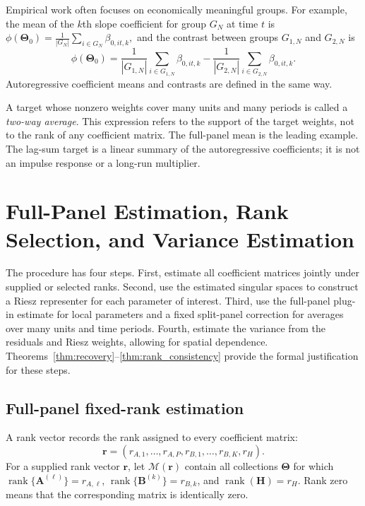 \documentclass[11pt]{article}
\numberwithin{equation}{section}
\theoremstyle{remark}
\newcommand{\rank}{\operatorname{rank}}
\newcommand{\br}{\bm r}
\newcommand{\bA}{\bm A}
\newcommand{\bB}{\bm B}
\newcommand{\bH}{\bm H}
\newcommand{\bTheta}{\bm\Theta}
\newcommand{\calM}{\mathcal M}
\begin{document}
Empirical work often focuses on economically meaningful groups. For example, the mean of the $k$th slope coefficient for group $G_N$ at time $t$ is
$
\phi(\bTheta_0)
=
\frac{1}{|G_N|}
\sum_{i\in G_N}\beta_{0,it,k},
$
and the contrast between groups $G_{1,N}$ and $G_{2,N}$ is
$$
\phi(\bTheta_0)
=
\frac{1}{|G_{1,N}|}\sum_{i\in G_{1,N}}\beta_{0,it,k}
-
\frac{1}{|G_{2,N}|}\sum_{i\in G_{2,N}}\beta_{0,it,k}.
$$
Autoregressive coefficient means and contrasts are defined in the same way.

A target whose nonzero weights cover many units and many periods is called a \emph{two-way average}. This expression refers to the support of the target weights, not to the rank of any coefficient matrix. The full-panel mean is the leading example. The lag-sum target is a linear summary of the autoregressive coefficients; it is not an impulse response or a long-run multiplier.


\section{Full-Panel Estimation, Rank Selection, and Variance Estimation}
\label{sec:estimation}

The procedure has four steps. First, estimate all coefficient matrices jointly under supplied or selected ranks. Second, use the estimated singular spaces to construct a Riesz representer for each parameter of interest. Third, use the full-panel plug-in estimate for local parameters and a fixed split-panel correction for averages over many units and time periods. Fourth, estimate the variance from the residuals and Riesz weights, allowing for spatial dependence. Theorems~\ref{thm:recovery}--\ref{thm:rank_consistency} provide the formal justification for these steps.

\subsection{Full-panel fixed-rank estimation}

A rank vector records the rank assigned to every coefficient matrix:
$$
\br
=
(r_{A,1},\ldots,r_{A,P},r_{B,1},\ldots,r_{B,K},r_H).
$$
For a supplied rank vector $\br$, let $\calM(\br)$ contain all collections $\bTheta$ for which $\rank\{\bA^{(\ell)}\}=r_{A,\ell}$, $\rank\{\bB^{(k)}\}=r_{B,k}$, and $\rank(\bH)=r_H$. Rank zero means that the corresponding matrix is identically zero.
\end{document}
